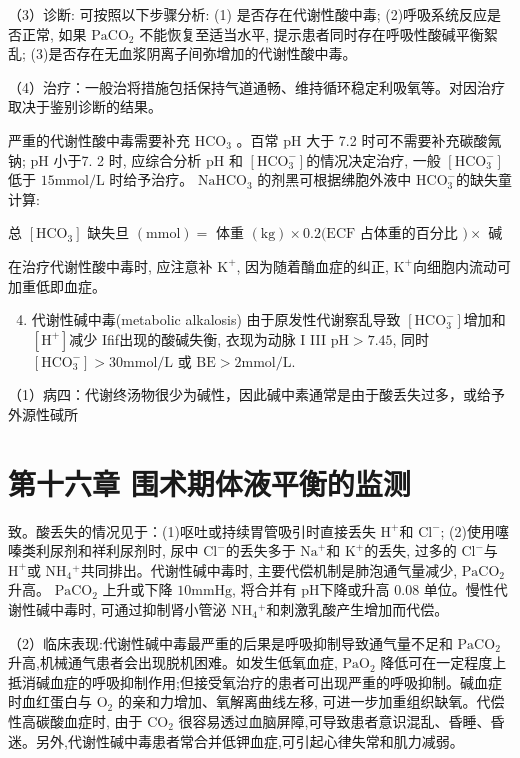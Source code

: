 \documentclass[10pt]{article}
\begin{document}
（3）诊断: 可按照以下步骤分析: (1) 是否存在代谢性酸中毒; (2)呼吸系统反应是否正常, 如果 $\mathrm{PaCO}_{2}$ 不能恢复至适当水平, 提示患者同时存在呼吸性酸碱平衡絮乱; (3)是否存在无血浆阴离子间弥增加的代谢性酸中毒。

（4）治疗：一般治将措施包括保持气道通畅、维持循环稳定利吸氧等。对因治疗取决于鉴别诊断的结果。

严重的代谢性酸中毒需要补充 $\mathrm{HCO}_{3}$ 。百常 $\mathrm{pH}$ 大于 7.2 时可不需要补充碳酸氞钠; $\mathrm{pH}$ 小于7. 2 时, 应综合分析 $\mathrm{pH}$ 和 $\left[\mathrm{HCO}_{3}^{-}\right]$的情况决定治疗, 一般 $\left[\mathrm{HCO}_{3}^{-}\right]$低于 $15 \mathrm{mmol} / \mathrm{L}$ 时给予治疗。 $\mathrm{NaHCO}_{3}$ 的剂黑可根据绋胞外液中 $\mathrm{HCO}_{3}^{-}$的缺失童计算:

总 $\left[\mathrm{HCO}_{3}\right]$ 缺失旦 $(\mathrm{mmol})=$ 体重 $(\mathrm{kg}) \times 0.2(\mathrm{ECF}$ 占体重的百分比 $) \times$ 碱

在治疗代谢性酸中毒时, 应注意补 $\mathrm{K}^{+}$, 因为随着酳血症的纠正, $\mathrm{K}^{+}$向细胞内流动可加重低即血症。

\begin{enumerate}
  \setcounter{enumi}{3}
  \item 代谢性碱中毒(metabolic alkalosis) 由于原发性代谢察乱导致 $\left[\mathrm{HCO}_{3}^{-}\right]$增加和 $\left[\mathrm{H}^{+}\right]$减少 Ifif出现的酸碱失衡, 衣现为动脉 I III $\mathrm{pH}>7.45$, 同时 $\left[\mathrm{HCO}_{3}^{-}\right]>30 \mathrm{mmol} / \mathrm{L}$ 或 $\mathrm{BE}>2 \mathrm{mmol} / \mathrm{L}$.
\end{enumerate}

（1）病四：代谢终汤物很少为碱性，因此碱中素通常是由于酸丢失过多，或给予外源性䂸所

\section*{第十六章 围术期体液平衡的监测}
致。酸丢失的情况见于：(1)呕吐或持续胃管吸引时直接丢失 $\mathrm{H}^{+}$和 $\mathrm{Cl}^{-}$; (2)使用噻嗪类利尿剂和祥利尿剂时, 尿中 $\mathrm{Cl}^{-}$的丢失多于 $\mathrm{Na}^{+}$和 $\mathrm{K}^{+}$的丢失, 过多的 $\mathrm{Cl}^{-}$与 $\mathrm{H}^{+}$或 $\mathrm{NH}_{4}{ }^{+}$共同排出。代谢性碱中毒时, 主要代偿机制是肺泡通气量减少, $\mathrm{PaCO}_{2}$ 升高。 $\mathrm{PaCO}_{2}$ 上升或下降 $10 \mathrm{mmHg}$, 将合并有 $\mathrm{pH}$下降或升高 0.08 单位。慢性代谢性碱中毒时, 可通过抑制肾小管泌 $\mathrm{NH}_{4}{ }^{+}$和刺激乳酸产生增加而代偿。

（2）临床表现:代谢性碱中毒最严重的后果是呼吸抑制导致通气量不足和 $\mathrm{PaCO}_{2}$ 升高,机械通气患者会出现脱机困难。如发生低氧血症, $\mathrm{PaO}_{2}$ 降低可在一定程度上抵消碱血症的呼吸抑制作用;但接受氧治疗的患者可出现严重的呼吸抑制。碱血症时血红蛋白与 $\mathrm{O}_{2}$ 的亲和力增加、氧解离曲线左移, 可进一步加重组织缺氧。代偿性高碳酸血症时, 由于 $\mathrm{CO}_{2}$ 很容易透过血脑屏障,可导致患者意识混乱、昏睡、昏迷。另外,代谢性碱中毒患者常合并低钾血症,可引起心律失常和肌力减弱。
\end{document}
